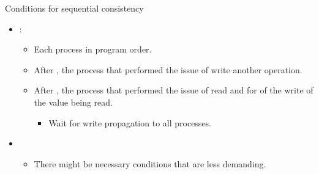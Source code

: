 \begin{frame}[t]{Conditions for sequential consistency}
\begin{itemize}
  \item {}:
    \begin{itemize}
      \item Each process  in program order.
      \item After , 
            the process that performed the issue  of write
             another operation.
      \item After , 
            the process that performed the issue  of read and
            for  of the write of the value being read.
        \begin{itemize}
          \item Wait for write propagation to all processes.
        \end{itemize}
    \end{itemize}

  \item {}
    \begin{itemize}
      \item There might be necessary conditions that are less demanding.
    \end{itemize}
\end{itemize}
\end{frame}

